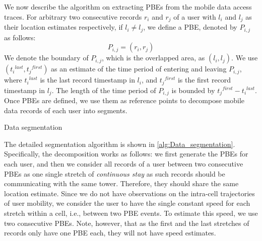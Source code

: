 We now describe the algorithm on extracting PBEs from the mobile data access traces. For arbitrary two consecutive records $r_i$ and $r_j$ of a user with $l_i$ and $l_j$ as their location estimates respectively, if $l_i \neq l_j$, we define a PBE, denoted by $P_{i, j}$ as follows:
\[
P_{i,j} = (r_i, r_j)
\]
We denote the boundary of $P_{i, j}$, which is the overlapped area, as $(l_i, l_j)$. We use $({t_i}^{last}, {t_j}^{first})$ as an estimate of the time period of entering and leaving $P_{i, j}$, where ${t_i}^{last}$ is the last record timestamp in $l_i$, and ${t_j}^{first}$ is the first record timestamp in $l_j$. The length of the time period of $P_{i, j}$ is bounded by ${t_j}^{first} - {t_i}^{last}$.
Once PBEs are defined, we use them as reference points to decompose mobile data records of each user into segments.

\begin{algorithm}
 \caption{Data segmentation}\label{alg:Data_segmentation}
\end{algorithm}

The detailed segmentation algorithm is shown in \autoref{alg:Data_segmentation}. Specifically, the decomposition works as follows: we first generate the PBEs for each user, and then we consider all records of a user between two consecutive PBEs as one single stretch of \emph{continuous stay} as such records should be communicating with the same tower. Therefore, they should share the same location estimate. Since we do not have observations on the intra-cell trajectories of user mobility, we consider the user to have the single constant speed for each stretch within a cell, i.e., between two PBE events. To estimate this speed, we use two consecutive PBEs. 
Note, however, that as the first and the last stretches of records only have one PBE each, they will not have speed estimates.

